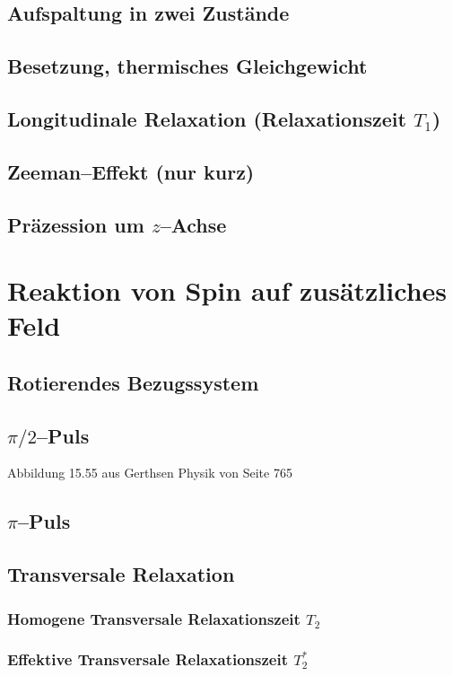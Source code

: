 \subsection{Aufspaltung in zwei Zustände}
\subsection{Besetzung, thermisches Gleichgewicht}
\subsection{Longitudinale Relaxation (Relaxationszeit $T_1$)}
\subsection{Zeeman–Effekt (nur kurz)}
\subsection{Präzession um $z$–Achse}

\section{Reaktion von Spin auf zusätzliches Feld}
\subsection{Rotierendes Bezugssystem}
\subsection{$\pi/2$–Puls}

Abbildung 15.55 aus Gerthsen Physik von Seite 765

\subsection{$\pi$–Puls}
\subsection{Transversale Relaxation}
\subsubsection{Homogene Transversale Relaxationszeit $T_2$}
\subsubsection{Effektive Transversale Relaxationszeit $T_2^*$}

